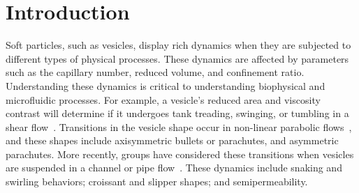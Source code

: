 \documentclass[twoside,twocolumn,9pt]{article}
\begin{document}
\renewcommand*\rmdefault{bch}\normalfont\upshape
\rmfamily
\section*{}
\vspace{-1cm}








\section{\label{sec:Introduction}Introduction}
Soft particles, such as vesicles, display rich dynamics when they are
subjected to different types of physical processes. These dynamics are
affected by parameters such as the capillary number, reduced volume, and
confinement ratio. Understanding these dynamics is critical to
understanding biophysical and microfluidic processes. For example, a
vesicle's reduced area and viscosity contrast will determine if it
undergoes tank treading, swinging, or tumbling in a shear
flow~\cite{nog-gom2005}. Transitions in the vesicle shape occur in
non-linear parabolic flows~\cite{kao-bir-mis2009, dan-vla-mis2009}, and
these shapes include axisymmetric bullets or parachutes, and asymmetric
parachutes. More recently, groups have considered these transitions when
vesicles are suspended in a channel or pipe
flow~\cite{lyu-che-far-jae-mis-leo2023, aga-bir2020, qua-gan-you2021,
abb-far-nai-ezz-ben-mis2022}. These dynamics include snaking and
swirling behaviors; croissant and slipper shapes; and semipermeability.
\end{document}
